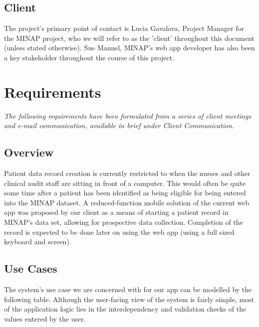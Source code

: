 \documentclass[12pt,a4paper,oneside,titlepage]{article}
\begin{document}
\subsection{Client}
The project's primary point of contact is Lucia Gavalova, Project Manager for the MINAP project, who we will refer to as the 'client' throughout this document (unless stated otherwise). Sue Manuel, MINAP's web app developer has also been a key stakeholder throughout the course of this project.

\newpage
\section{Requirements}
\textit{The following requirements have been formulated from a series of client meetings and e-mail communication, available in brief under Client Communication.}

\subsection{Overview}
Patient data record creation is currently restricted to when the nurses and other clinical audit staff are sitting in front of a computer. This would often be quite some time after a patient has been identified as being eligible for being entered into the MINAP dataset. A reduced-function mobile solution of the current web app was proposed by our client as a means of starting a patient record in MINAP's data set, allowing for prospective data collection. Completion of the record is expected to be done later on using the web app (using a full sized keyboard and screen).

\subsection{Use Cases}
The system's use case we are concerned with for our app can be modelled by the following table. Although the user-facing view of the system is fairly simple, most of the application logic lies in the interdependency and validation checks of the values entered by the user. 
\end{document}
